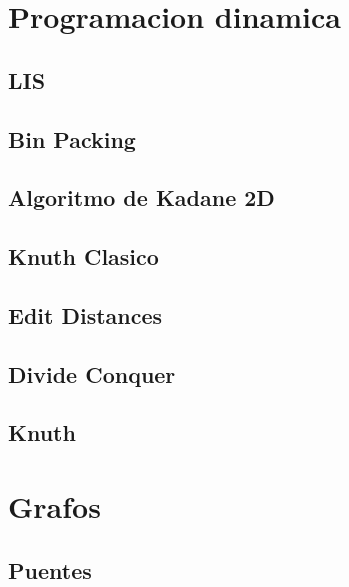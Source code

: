 \section{Programacion dinamica}
\subsection{LIS}
\raggedbottom
\hrulefill
\subsection{Bin Packing}
\raggedbottom
\hrulefill
\subsection{Algoritmo de Kadane 2D}
\raggedbottom
\hrulefill
\subsection{Knuth Clasico}
\raggedbottom
\hrulefill
\subsection{Edit Distances}
\raggedbottom
\hrulefill
\subsection{Divide Conquer}
\raggedbottom
\hrulefill
\subsection{Knuth}
\raggedbottom
\hrulefill

\section{Grafos}
\subsection{Puentes}
\raggedbottom
\hrulefill
